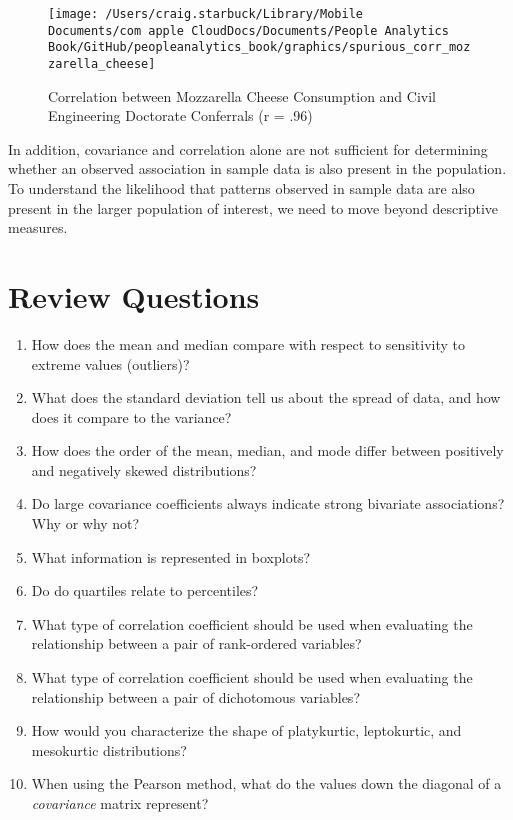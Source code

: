 \documentclass[
]{book}
\begin{document}
\begin{figure}

{\centering \texttt{[image: /Users/craig.starbuck/Library/Mobile Documents/com~apple~CloudDocs/Documents/People Analytics Book/GitHub/peopleanalytics\_book/graphics/spurious\_corr\_mozzarella\_cheese]} 

}

\caption{Correlation between Mozzarella Cheese Consumption and Civil Engineering Doctorate Conferrals (r = .96)}\label{fig:spur-corr-2}
\end{figure}

In addition, covariance and correlation alone are not sufficient for determining whether an observed association in sample data is also present in the population. To understand the likelihood that patterns observed in sample data are also present in the larger population of interest, we need to move beyond descriptive measures.

\hypertarget{review-questions-5}{%
\section{Review Questions}\label{review-questions-5}}

\begin{enumerate}
\def\labelenumi{\arabic{enumi}.}
\item
  How does the mean and median compare with respect to sensitivity to extreme values (outliers)?
\item
  What does the standard deviation tell us about the spread of data, and how does it compare to the variance?
\item
  How does the order of the mean, median, and mode differ between positively and negatively skewed distributions?
\item
  Do large covariance coefficients always indicate strong bivariate associations? Why or why not?
\item
  What information is represented in boxplots?
\item
  Do do quartiles relate to percentiles?
\item
  What type of correlation coefficient should be used when evaluating the relationship between a pair of rank-ordered variables?
\item
  What type of correlation coefficient should be used when evaluating the relationship between a pair of dichotomous variables?
\item
  How would you characterize the shape of platykurtic, leptokurtic, and mesokurtic distributions?
\item
  When using the Pearson method, what do the values down the diagonal of a \emph{covariance} matrix represent?
\end{enumerate}
\end{document}
